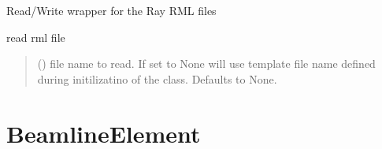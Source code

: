 \documentclass[letterpaper,10pt,english]{sphinxmanual}
\begin{document}
\begin{fulllineitems}
\label{\detokenize{code_documentation:raypyng.rml.RMLFile}}
\pysigstartsignatures
{}
\pysigstopsignatures
\sphinxAtStartPar
Read/Write wrapper for the Ray RML files

\begin{fulllineitems}
\label{\detokenize{code_documentation:raypyng.rml.RMLFile.read}}
\pysigstartsignatures
{}
\pysigstopsignatures
\sphinxAtStartPar
read rml file
\begin{quote}\begin{description}
\sphinxAtStartPar
{} (\sphinxstyleliteralemphasis{\sphinxupquote{, }}) \textendash{} file name to read. If set to None will use template file name defined during initilizatino of the class. Defaults to None.

\end{description}\end{quote}

\end{fulllineitems}


\end{fulllineitems}



\section{BeamlineElement}
\label{\detokenize{code_documentation:beamlineelement}}
\end{document}
